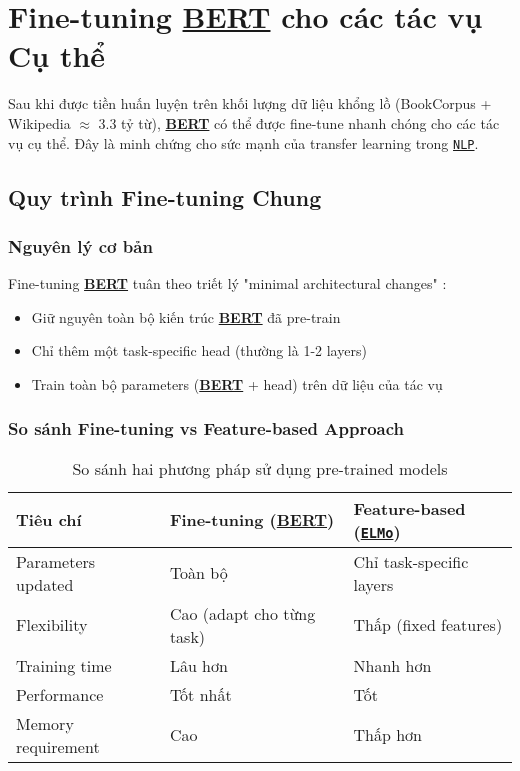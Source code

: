 \section{Fine-tuning \hyperref[acro:bert]{\textbf{BERT}} cho các tác vụ Cụ thể}
\label{sec:fine_tuning_bert}

Sau khi được tiền huấn luyện trên khối lượng dữ liệu khổng lồ (BookCorpus + Wikipedia $\approx$ 3.3 tỷ từ), \hyperref[acro:bert]{\textbf{BERT}} có thể được fine-tune nhanh chóng cho các tác vụ cụ thể. Đây là minh chứng cho sức mạnh của transfer learning trong \hyperref[acro:nlp]{\texttt{NLP}}.

\subsection{Quy trình Fine-tuning Chung}
\label{ssec:quy_trinh_tinh_chinh}

\subsubsection{Nguyên lý cơ bản}
Fine-tuning \hyperref[acro:bert]{\textbf{BERT}} tuân theo triết lý "minimal architectural changes" \cite{devlin2018bert}:
\begin{itemize}
    \item Giữ nguyên toàn bộ kiến trúc \hyperref[acro:bert]{\textbf{BERT}} đã pre-train
    \item Chỉ thêm một task-specific head (thường là 1-2 layers)
    \item Train toàn bộ parameters (\hyperref[acro:bert]{\textbf{BERT}} + head) trên dữ liệu của tác vụ
\end{itemize}

\subsubsection{So sánh Fine-tuning vs Feature-based Approach}
\begin{table}[H]
\centering
\caption{So sánh hai phương pháp sử dụng pre-trained models}
\label{tab:finetune_vs_feature}
\begin{tabular}{lll}
\toprule
\textbf{Tiêu chí} & \textbf{Fine-tuning (\hyperref[acro:bert]{\textbf{BERT}})} & \textbf{Feature-based (\hyperref[acro:elmo]{\texttt{ELMo}})} \\
\midrule
Parameters updated & Toàn bộ & Chỉ task-specific layers \\
Flexibility & Cao (adapt cho từng task) & Thấp (fixed features) \\
Training time & Lâu hơn & Nhanh hơn \\
Performance & Tốt nhất & Tốt \\
Memory requirement & Cao & Thấp hơn \\
\bottomrule
\end{tabular}
\end{table}

